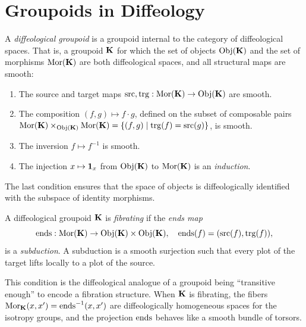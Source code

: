 \documentclass[10pt,reqno,letterpaper,twoside]{amsbook}
\begin{document}
  
  \section{Groupoids in Diffeology}
  \label{sec:Groupoids in Diffeology}
  
  A \emph{diffeological groupoid} is a groupoid internal to the category of diffeological spaces.
  That is, a groupoid ${\mathbf K}$ for which the set of objects ${\operatorname{Obj}}({\mathbf K})$ and the set of morphisms ${\operatorname{Mor}}({\mathbf K})$ are both diffeological spaces,
  and all structural maps are smooth:
  \begin{enumerate}
    \item The source and target maps $\operatorname{src}, \operatorname{trg}: {\operatorname{Mor}}({\mathbf K}) \to {\operatorname{Obj}}({\mathbf K})$ are smooth.
    \item The composition $(f,g) \mapsto f \cdot g$,
    defined on the subset of composable pairs
    ${\operatorname{Mor}}({\mathbf K}) \times_{{\operatorname{Obj}}({\mathbf K})} {\operatorname{Mor}}({\mathbf K}) = \{ (f,g) \mid \operatorname{trg}(f) = \operatorname{src}(g) \}$,
    is smooth.
    \item The inversion $f \mapsto f^{-1}$ is smooth.
    \item The injection $x \mapsto \boldsymbol{1}_x$ from ${\operatorname{Obj}}({\mathbf K})$ to ${\operatorname{Mor}}({\mathbf K})$ is an \emph{induction}.
  \end{enumerate}
  The last condition ensures that the space of objects is diffeologically identified with the subspace of identity morphisms.
  
  \begin{article}
    A diffeological groupoid ${\mathbf K}$ is \emph{fibrating} if the \emph{ends map}
    \[
      \operatorname{ends}: {\operatorname{Mor}}({\mathbf K}) \to {\operatorname{Obj}}({\mathbf K}) \times {\operatorname{Obj}}({\mathbf K}), \quad
      \operatorname{ends}(f) = (\operatorname{src}(f), \operatorname{trg}(f)),
      \]
    is a \emph{subduction}.
    A subduction is a smooth surjection such that every plot of the target lifts locally to a plot of the source.
    
    This condition is the diffeological analogue of a groupoid being ``transitive enough''
    to encode a fibration structure.
    When ${\mathbf K}$ is fibrating,
    the fibers ${\operatorname{Mor}}_{{\mathbf K}}(x,x') = \operatorname{ends}^{-1}(x,x')$ are diffeologically homogeneous spaces for the isotropy groups,
    and the projection $\operatorname{ends}$ behaves like a smooth bundle of torsors.
  \end{article}
  
\end{document}

